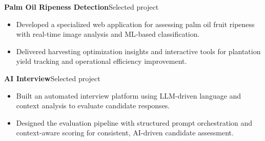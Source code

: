 \textbf{Palm Oil Ripeness Detection}\hfill {\color{SecondaryText}\small Selected project}\par
\begin{itemize}
  \item Developed a specialized web application for assessing palm oil fruit ripeness with real-time image analysis and ML-based classification.
  \item Delivered harvesting optimization insights and interactive tools for plantation yield tracking and operational efficiency improvement.
\end{itemize}

\textbf{AI Interview}\hfill {\color{SecondaryText}\small Selected project}\par
\begin{itemize}
  \item Built an automated interview platform using LLM-driven language and context analysis to evaluate candidate responses.
  \item Designed the evaluation pipeline with structured prompt orchestration and context-aware scoring for consistent, AI-driven candidate assessment.
\end{itemize}
